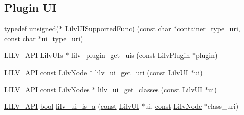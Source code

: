 \subsection*{Plugin UI}
\begin{DoxyCompactItemize}
\item 
typedef unsigned($\ast$ \hyperlink{group__lilv_gabe16181bb064cb9e09519d15430c0f62}{Lilv\+U\+I\+Supported\+Func}) (\hyperlink{getopt1_8c_a2c212835823e3c54a8ab6d95c652660e}{const} char $\ast$container\+\_\+type\+\_\+uri, \hyperlink{getopt1_8c_a2c212835823e3c54a8ab6d95c652660e}{const} char $\ast$ui\+\_\+type\+\_\+uri)
\item 
\hyperlink{lilv_8h_aa5182eee7ddff96862d0171967ee6f77}{L\+I\+L\+V\+\_\+\+A\+PI} \hyperlink{lilv_8h_af0d073c97d807e531f174ce2ee1b5492}{Lilv\+U\+Is} $\ast$ \hyperlink{group__lilv_ga420636169dd115cf90b2e136309bbca0}{lilv\+\_\+plugin\+\_\+get\+\_\+uis} (\hyperlink{getopt1_8c_a2c212835823e3c54a8ab6d95c652660e}{const} \hyperlink{lilv_8h_a94e36303167a78a0c392f881136b461b}{Lilv\+Plugin} $\ast$plugin)
\item 
\hyperlink{lilv_8h_aa5182eee7ddff96862d0171967ee6f77}{L\+I\+L\+V\+\_\+\+A\+PI} \hyperlink{getopt1_8c_a2c212835823e3c54a8ab6d95c652660e}{const} \hyperlink{lilv_8h_ae183dca3dca5368d34dbd863a405437b}{Lilv\+Node} $\ast$ \hyperlink{group__lilv_ga47bad236205f9247176442b3483d23ac}{lilv\+\_\+ui\+\_\+get\+\_\+uri} (\hyperlink{getopt1_8c_a2c212835823e3c54a8ab6d95c652660e}{const} \hyperlink{lilv_8h_a42d32f453a79ab1c944daa6436f22dde}{Lilv\+UI} $\ast$ui)
\item 
\hyperlink{lilv_8h_aa5182eee7ddff96862d0171967ee6f77}{L\+I\+L\+V\+\_\+\+A\+PI} \hyperlink{getopt1_8c_a2c212835823e3c54a8ab6d95c652660e}{const} \hyperlink{lilv_8h_a256c2c4443307f320de24bb31198df83}{Lilv\+Nodes} $\ast$ \hyperlink{group__lilv_gace150176f3c6ea0dd2a1a197c0bbbeaf}{lilv\+\_\+ui\+\_\+get\+\_\+classes} (\hyperlink{getopt1_8c_a2c212835823e3c54a8ab6d95c652660e}{const} \hyperlink{lilv_8h_a42d32f453a79ab1c944daa6436f22dde}{Lilv\+UI} $\ast$ui)
\item 
\hyperlink{lilv_8h_aa5182eee7ddff96862d0171967ee6f77}{L\+I\+L\+V\+\_\+\+A\+PI} \hyperlink{mac_2config_2i386_2lib-src_2libsoxr_2soxr-config_8h_abb452686968e48b67397da5f97445f5b}{bool} \hyperlink{group__lilv_ga420cd7c6dd1edb02dc0c61d1a58e7985}{lilv\+\_\+ui\+\_\+is\+\_\+a} (\hyperlink{getopt1_8c_a2c212835823e3c54a8ab6d95c652660e}{const} \hyperlink{lilv_8h_a42d32f453a79ab1c944daa6436f22dde}{Lilv\+UI} $\ast$ui, \hyperlink{getopt1_8c_a2c212835823e3c54a8ab6d95c652660e}{const} \hyperlink{lilv_8h_ae183dca3dca5368d34dbd863a405437b}{Lilv\+Node} $\ast$class\+\_\+uri)

\end{DoxyCompactItemize}
